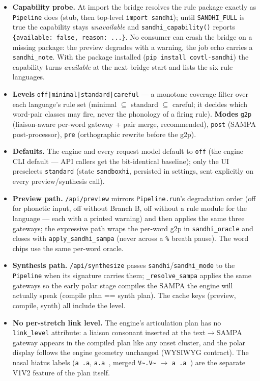 \documentclass[11pt,a4paper]{article}
\begin{document}
\begin{itemize}
\item \textbf{Capability probe.} At import the bridge resolves the rule
  package exactly as \texttt{Pipeline} does (stub, then top-level
  \texttt{import sandhi}); until \texttt{SANDHI\_FULL} is true the
  capability stays \emph{unavailable} and \texttt{sandhi\_capability()}
  reports \texttt{\{available: false, reason: ...\}}. No consumer can
  crash the bridge on a missing package: the preview degrades with a
  warning, the job echo carries a \texttt{sandhi\_note}. With the
  package installed (\texttt{pip install covtl-sandhi}) the capability
  turns \emph{available} at the next bridge start and lists the six
  rule languages.
\item \textbf{Levels} \texttt{off|minimal|standard|careful} --- a
  monotone coverage filter over each language's rule set (minimal
  $\subseteq$ standard $\subseteq$ careful; it decides which word-pair
  classes may fire, never the phonology of a firing rule). \textbf{Modes}
  \texttt{g2p} (liaison-aware per-word gateway + pair merge,
  recommended), \texttt{post} (SAMPA post-processor), \texttt{pre}
  (orthographic rewrite before the g2p).
\item \textbf{Defaults.} The engine and every request model default to
  \texttt{off} (the engine CLI default — API callers get the
  bit-identical baseline); only the UI preselects \texttt{standard}
  (state \texttt{sandboxhi}, persisted in settings, sent explicitly on
  every preview/synthesis call).
\item \textbf{Preview path.} \texttt{/api/preview} mirrors
  \texttt{Pipeline.run}'s degradation order (off for phonetic input, off
  without Branch B, off without a rule module for the language --- each
  with a printed warning) and then applies the same three gateways; the
  expressive path wraps the per-word g2p in \texttt{sandhi\_oracle} and
  closes with \texttt{apply\_sandhi\_sampa} (never across a
  \texttt{\%} breath pause). The word chips use the same per-word
  oracle.
\item \textbf{Synthesis path.} \texttt{/api/synthesize} passes
  \texttt{sandhi}/\texttt{sandhi\_mode} to the \texttt{Pipeline} when
  its signature carries them; \texttt{\_resolve\_sampa} applies the same
  gateways so the early polar stage compiles the SAMPA the engine will
  actually speak (compile plan == synth plan). The cache keys
  (preview, compile, synth) all include the level.
\item \textbf{No per-stretch link level.} The engine's articulation plan
  has no \texttt{link\_level} attribute: a liaison consonant inserted at
  the text$\rightarrow$SAMPA gateway appears in the compiled plan like
  any onset cluster, and the polar display follows the engine geometry
  unchanged (WYSIWYG contract). The nasal hiatus labels
  (\texttt{a~.a}, \texttt{a.a~}, merged \texttt{V\~{}.V\~{}} $\rightarrow$
  \texttt{a~.a~}) are the separate V1V2 feature of the plan itself.
\end{itemize}
\end{document}
